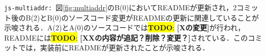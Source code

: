 \documentclass[uplatex,dvipdfmx,a4paper,twocolumn,base=11pt,jbase=11pt,ja=standard]{bxjsarticle}  %
\newcommand{\todo}[1]{\colorbox{yellow}{{\bf TODO}:}{\color{red} {\textbf{[#1]}}}}
\begin{document}
%



\noindent\texttt{js-multiaddr: }図\ref{fig:multiaddr}のB(0)においてREADMEが更新され，2コミット後のB(2)とB(0)のソースコード変更がREADMEの更新に関連していることが示唆される．A(2)とA(0)のソースコードでは\todo{Xの変更}が行われ，READMEには\todo{XXの内容が追記？削除？変更？}されている．このコミットでは，実装前にREADMEが更新されたことが示唆される．



%
%
%


\end{document}
